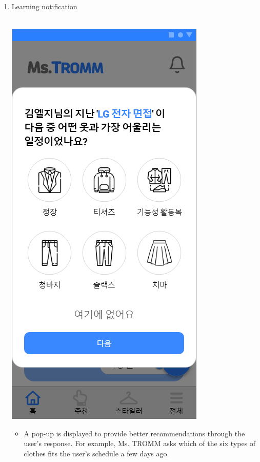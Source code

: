 \documentclass[conference]{IEEEtran}
\begin{document}
\begin{enumerate}
    \item Learning notification \\ \\
        \centerline{\includegraphics[scale=0.32]{assets/학습 팝업1.png}}
        \begin{itemize}
            \item[] A pop-up is displayed to provide better recommendations through the user's response. For example, Ms. TROMM asks which of the six types of clothes fits the user's schedule a few days ago.\\ \\ \\ \\ 
        \end{itemize}
        \begin{itemize}

\end{itemize}
\end{enumerate}
\end{document}
